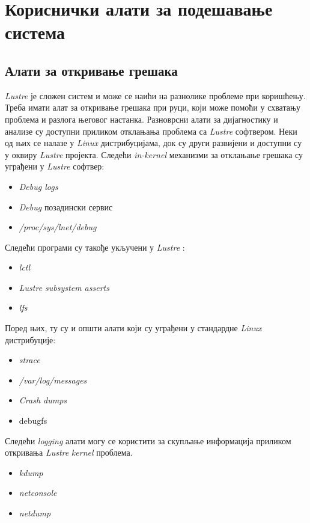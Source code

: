 \section{Кориснички алати за подешавање система}
\subsection{Алати за откривање грешака} 
  \textit{Lustre}  је сложен систем и може се наићи на разнолике проблеме при коришћењу. Треба имати алат за откривање грешака при руци, који може помоћи у схватању проблема и разлога његовог настанка. Разноврсни алати за дијагностику и анализе су доступни приликом отклањања проблема са   \textit{Lustre}  софтвером. Неки од њих се налазе у \textit{Linux} дистрибуцијама, док су
други  развијени и доступни су у оквиру    \textit{Lustre} пројекта. Следећи  \textit{in-kernel} механизми за отклањање грешака  су уграђени у   \textit{Lustre}  софтвер:

\begin{itemize}
\item  \textit{Debug logs}

\item  \textit{Debug} позадински сервис

\item  \textit{/proc/sys/lnet/debug}
\end{itemize}
Следећи програми су такође укључени у   \textit{Lustre} :
\begin{itemize}
\item \textit{lctl}

\item   \textit{Lustre subsystem asserts}

\item \textit{lfs}
\end{itemize}
Поред њих, ту су и општи алати који су уграђени у стандардне \textit{Linux} дистрибуције:
\begin{itemize}
\item \textit{strace}

\item \textit{/var/log/messages}

\item \textit{Crash dumps}

\item debugfs
\end{itemize}
Следећи \textit{logging} алати могу се користити за скупљање информација приликом откривања   \textit{Lustre}  \textit{kernel} проблема.
\begin{itemize}
\item \textit{kdump}

\item \textit{netconsole}

\item \textit{netdump}
\end{itemize}

